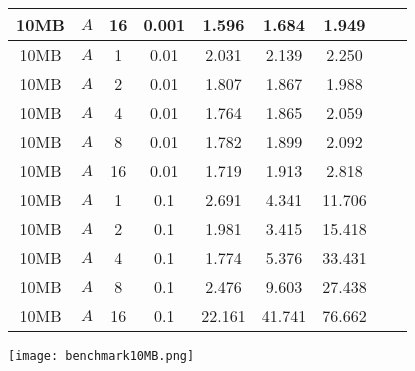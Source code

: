 \begin{figure}[H]
\begin{tabular}{|c|c|c|c|c|c|c|c|c|}
        10MB & $A$ & 16 & 0.001 & 1.596 & 1.684 & 1.949\\\hline
        10MB & $A$ & 1 & 0.01 & 2.031 & 2.139 & 2.250\\\hline
        10MB & $A$ & 2 & 0.01 & 1.807 & 1.867 & 1.988\\\hline
        10MB & $A$ & 4 & 0.01 & 1.764 & 1.865 & 2.059\\\hline
        10MB & $A$ & 8 & 0.01 & 1.782 & 1.899 & 2.092\\\hline
        10MB & $A$ & 16 & 0.01 & 1.719 & 1.913 & 2.818\\\hline
        10MB & $A$ & 1 & 0.1 & 2.691 & 4.341 & 11.706\\\hline
        10MB & $A$ & 2 & 0.1 & 1.981 & 3.415 & 15.418\\\hline
        10MB & $A$ & 4 & 0.1 & 1.774 & 5.376 & 33.431\\\hline
        10MB & $A$ & 8 & 0.1 & 2.476 & 9.603 & 27.438\\\hline
        10MB & $A$ & 16 & 0.1 & 22.161 & 41.741 & 76.662\\\hline
    \end{tabular}
    \vspace{1cm}
    \texttt{[image: benchmark10MB.png]}
\end{figure}

